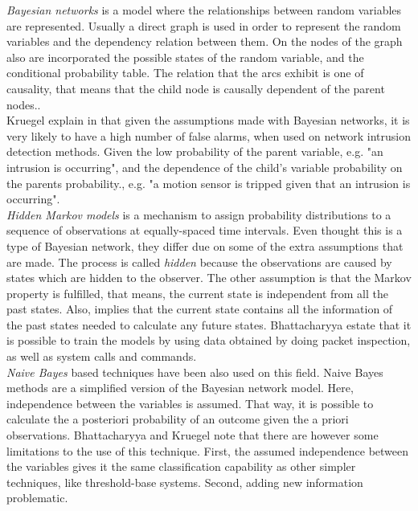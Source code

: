 \begin{itemize}
\textit{Bayesian networks} is a model where the relationships between random variables are represented. Usually a direct graph is used in order to represent the random variables and the dependency relation between them. On the nodes of the graph also are incorporated the possible states of the random variable, and the conditional probability table\cite{Kruegel:2003:BEC:956415.956436}. The relation that the arcs exhibit is one of causality, that means that the child node is causally dependent of the parent nodes.\cite{Kruegel:2003:BEC:956415.956436}. \\
Kruegel \etAl explain in \cite{Kruegel:2003:BEC:956415.956436} that given the assumptions made with Bayesian networks, it is very likely to have a high number of false alarms, when used on network intrusion detection methods. Given the low probability of the parent variable, e.g. "an intrusion is occurring", and the dependence of the child's variable probability on the parents probability., e.g. "a motion sensor is tripped given that an intrusion is occurring".  \\

\textit{Hidden Markov models} is a mechanism to assign probability distributions to a sequence of observations at equally-spaced time intervals. Even thought this is a type of Bayesian network, they differ due on some of the extra assumptions that are made\cite{Ghahramani:2001:IHM:505741.505743}. The process is called \textit{hidden} because the observations are caused by states which are hidden to the observer. The other assumption is that the Markov property is fulfilled, that means, the current state is independent from all the past states. Also, implies that the current state contains all the information of the past states needed to calculate any future states. Bhattacharyya \etAl estate that it is possible to train the models by using data obtained by doing packet inspection, as well as system calls and commands.\\

\textit{Naive Bayes} based techniques have been also used on this field. Naive Bayes methods are a simplified version of the Bayesian network model\cite{Langley:1992:ABC:1867135.1867170}. Here, independence between the variables is assumed. That way, it is possible to calculate the a posteriori probability of an outcome given the a priori observations. Bhattacharyya \etAl and Kruegel \etAl note that there are however some limitations to the use of this technique. First, the assumed independence between the variables gives it the same classification capability as other simpler techniques, like threshold-base systems. Second, adding new information problematic. \\


\end{itemize}
